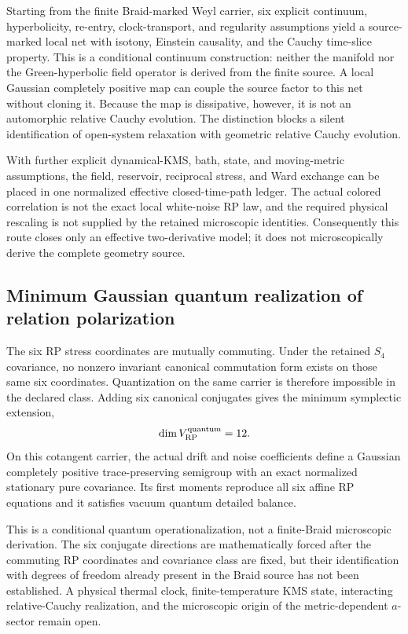 \documentclass[11pt]{article}
\theoremstyle{definition}
\theoremstyle{remark}
\begin{document}
Starting from the finite Braid-marked Weyl carrier, six explicit continuum, hyperbolicity, re-entry, clock-transport, and regularity assumptions yield a source-marked local net with isotony, Einstein causality, and the Cauchy time-slice property. This is a conditional continuum construction: neither the manifold nor the Green-hyperbolic field operator is derived from the finite source. A local Gaussian completely positive map can couple the source factor to this net without cloning it. Because the map is dissipative, however, it is not an automorphic relative Cauchy evolution. The distinction blocks a silent identification of open-system relaxation with geometric relative Cauchy evolution.

With further explicit dynamical-KMS, bath, state, and moving-metric assumptions, the field, reservoir, reciprocal stress, and Ward exchange can be placed in one normalized effective closed-time-path ledger. The actual colored correlation is not the exact local white-noise RP law, and the required physical rescaling is not supplied by the retained microscopic identities. Consequently this route closes only an effective two-derivative model; it does not microscopically derive the complete geometry source.

\subsection{Minimum Gaussian quantum realization of relation polarization}

The six RP stress coordinates are mutually commuting. Under the retained $S_4$ covariance, no nonzero invariant canonical commutation form exists on those same six coordinates. Quantization on the same carrier is therefore impossible in the declared class. Adding six canonical conjugates gives the minimum symplectic extension,
\begin{equation}
 \dim V_{\rm RP}^{\rm quantum}=12.
\end{equation}
On this cotangent carrier, the actual drift and noise coefficients define a Gaussian completely positive trace-preserving semigroup with an exact normalized stationary pure covariance. Its first moments reproduce all six affine RP equations and it satisfies vacuum quantum detailed balance.

This is a conditional quantum operationalization, not a finite-Braid microscopic derivation. The six conjugate directions are mathematically forced after the commuting RP coordinates and covariance class are fixed, but their identification with degrees of freedom already present in the Braid source has not been established. A physical thermal clock, finite-temperature KMS state, interacting relative-Cauchy realization, and the microscopic origin of the metric-dependent $a$-sector remain open.
\end{document}
